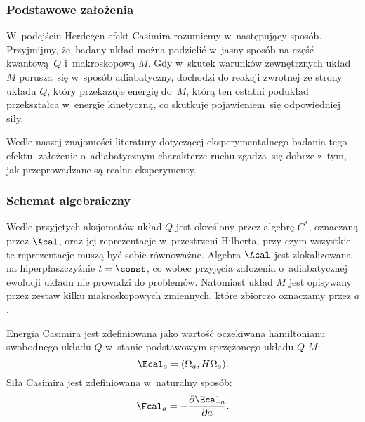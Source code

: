 \documentclass[10pt,t]{beamer}
\begin{document}
\begin{frame}
  \frametitle{Podstawowe założenia}


  W~podejściu Herdegen efekt Casimira rozumiemy w~następujący sposób.
  Przyjmijmy, że~badany układ można podzielić w~jasny sposób na część
  kwantową~$Q$ i~makroskopową $M$. Gdy w~skutek warunków zewnętrznych układ
  $M$ porusza~się w~sposób adiabatyczny, dochodzi do reakcji zwrotnej ze
  strony układu $Q$, który przekazuje energię do~$M$, którą ten ostatni
  podukład przekształca w~energię kinetyczną, co skutkuje pojawieniem~się
  odpowiedniej siły.

  Wedle naszej znajomości literatury dotyczącej eksperymentalnego badania
  tego efektu, założenie o~adiabatycznym charakterze ruchu zgadza~się
  dobrze z~tym, jak przeprowadzane są realne eksperymenty.

\end{frame}









\begin{frame}
  \frametitle{Schemat algebraiczny}


  Wedle przyjętych aksjomatów układ $Q$ jest określony przez algebrę
  $C^{ * }$, oznaczaną przez $\Acal$, oraz jej reprezentacje w~przestrzeni
  Hilberta, przy czym wszystkie te reprezentacje muszą być sobie równoważne.
  Algebra $\Acal$ jest zlokalizowana na hiperpłaszczyźnie $t = \const$, co
  wobec przyjęcia założenia o~adiabatycznej ewolucji układu nie prowadzi
  do problemów. Natomiast układ $M$ jest opisywany przez zestaw kilku
  makroskopowych zmiennych, które zbiorczo oznaczamy przez $a$.

  Energia Casimira jest zdefiniowana jako wartość oczekiwana
  hamiltonianu \alert{swobodnego} układu $Q$ w~stanie podstawowym
  sprzężonego układu $Q\text{-}M$:
  \begin{equation}
    \label{eq:Algebraiczne-podejscie-ETC-01}
    \Ecal_{ a } = ( \Omega_{ a }, H \Omega_{ a } ).
  \end{equation}
  Siła Casimira jest zdefiniowana w~naturalny sposób:
  \begin{equation}
    \label{eq:Algebraiczne-podejscie-ETC-02}
    \Fcal_{ a } = -\frac{ \partial \Ecal_{ a } }{ \partial a }.
  \end{equation}

\end{frame}
\end{document}
